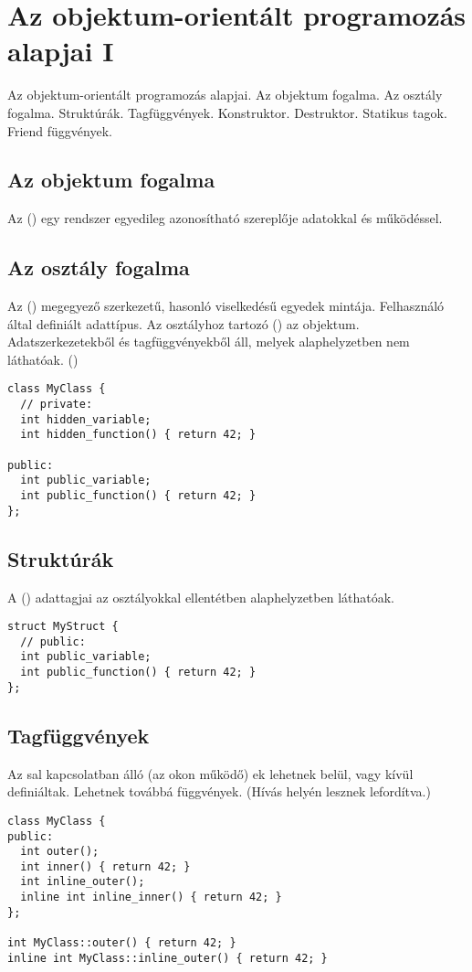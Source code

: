 \documentclass[../../main.tex]{subfiles}
\begin{document}
\section{Az objektum-orientált programozás alapjai I}

\begin{fulltheorem}
	Az objektum-orientált programozás alapjai. Az objektum fogalma. Az osztály
	fogalma. Struktúrák. Tagfüggvények. Konstruktor. Destruktor. Statikus tagok.
	Friend függvények.
\end{fulltheorem}

\subsection{Az objektum fogalma}

Az  () egy rendszer egyedileg azonosítható szereplője
adatokkal és működéssel.

\subsection{Az osztály fogalma}

Az  () megegyező szerkezetű, hasonló viselkedésű
egyedek mintája. Felhasználó által definiált adattípus. Az osztályhoz tartozó
 () az objektum. Adatszerkezetekből és
tagfüggvényekből áll, melyek alaphelyzetben nem láthatóak. ()

\begin{verbatim}
class MyClass {
  // private:
  int hidden_variable;
  int hidden_function() { return 42; }

public:
  int public_variable;
  int public_function() { return 42; }
};
\end{verbatim}

\subsection{Struktúrák}

A  () adattagjai az osztályokkal ellentétben
alaphelyzetben láthatóak.

\begin{verbatim}
struct MyStruct {
  // public:
  int public_variable;
  int public_function() { return 42; }
};
\end{verbatim}

\subsection{Tagfüggvények}
Az sal kapcsolatban álló (az okon működő)
ek lehetnek belül, vagy kívül definiáltak. Lehetnek továbbá
 függvények. (Hívás helyén lesznek lefordítva.)
\begin{verbatim}
class MyClass {
public:
  int outer();
  int inner() { return 42; }
  int inline_outer();
  inline int inline_inner() { return 42; }
};

int MyClass::outer() { return 42; }
inline int MyClass::inline_outer() { return 42; }
\end{verbatim}
\end{document}

